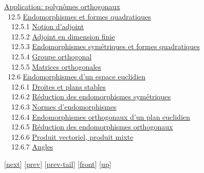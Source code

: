 \documentclass[]{article}
\begin{document}
\href{coursse70.html\#x85-38500012.4.7}{Application: polynômes
orthogonaux} \\ ~12.5
\href{coursse71.html\#x86-38600012.5}{Endomorphismes et formes
quadratiques} \\ ~~12.5.1 \href{coursse71.html\#x86-38700012.5.1}{Notion
d'adjoint} \\ ~~12.5.2 \href{coursse71.html\#x86-38800012.5.2}{Adjoint
en dimension finie} \\ ~~12.5.3
\href{coursse71.html\#x86-38900012.5.3}{Endomorphismes symétriques et
formes quadratiques} \\ ~~12.5.4
\href{coursse71.html\#x86-39000012.5.4}{Groupe orthogonal} \\ ~~12.5.5
\href{coursse71.html\#x86-39100012.5.5}{Matrices orthogonales} \\ ~12.6
\href{coursse72.html\#x87-39200012.6}{Endomorphismes d'un espace
euclidien} \\ ~~12.6.1 \href{coursse72.html\#x87-39300012.6.1}{Droites
et plans stables} \\ ~~12.6.2
\href{coursse72.html\#x87-39400012.6.2}{Réduction des endomorphismes
symétriques} \\ ~~12.6.3 \href{coursse72.html\#x87-39500012.6.3}{Normes
d'endomorphismes} \\ ~~12.6.4
\href{coursse72.html\#x87-39600012.6.4}{Endomorphismes orthogonaux d'un
plan euclidien} \\ ~~12.6.5
\href{coursse72.html\#x87-39700012.6.5}{Réduction des endomorphismes
orthogonaux} \\ ~~12.6.6 \href{coursse72.html\#x87-39800012.6.6}{Produit
vectoriel, produit mixte} \\ ~~12.6.7
\href{coursse72.html\#x87-39900012.6.7}{Angles}

{[}\href{coursch14.html}{next}{]} {[}\href{coursch12.html}{prev}{]}
{[}\href{coursch12.html\#tailcoursch12.html}{prev-tail}{]}
{[}\href{coursch13.html}{front}{]}
{[}\href{cours.html\#coursch13.html}{up}{]}
\end{document}
